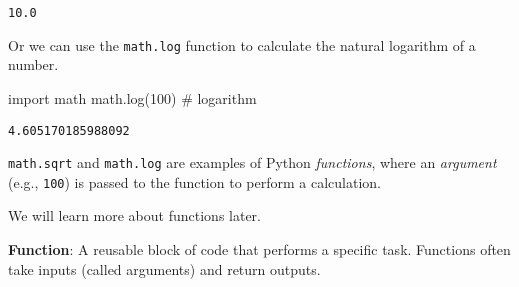 \documentclass[
  letterpaper,
  DIV=11,
  numbers=noendperiod]{scrreprt}
\newenvironment{Shaded}{\begin{snugshade}}{\end{snugshade}}
\newcommand{\CommentTok}[1]{\textcolor[rgb]{0.37,0.37,0.37}{#1}}
\newcommand{\DecValTok}[1]{\textcolor[rgb]{0.68,0.00,0.00}{#1}}
\newcommand{\ImportTok}[1]{\textcolor[rgb]{0.00,0.46,0.62}{#1}}
\newcommand{\NormalTok}[1]{\textcolor[rgb]{0.00,0.23,0.31}{#1}}
\begin{document}
\begin{verbatim}
10.0
\end{verbatim}

Or we can use the \texttt{math.log} function to calculate the natural
logarithm of a number.

\begin{Shaded}
\begin{Highlighting}[]
\ImportTok{import}\NormalTok{ math}
\NormalTok{math.log(}\DecValTok{100}\NormalTok{)  }\CommentTok{\# logarithm}
\end{Highlighting}
\end{Shaded}

\begin{verbatim}
4.605170185988092
\end{verbatim}

\texttt{math.sqrt} and \texttt{math.log} are examples of Python
\emph{functions}, where an \emph{argument} (e.g., \texttt{100}) is
passed to the function to perform a calculation.

We will learn more about functions later.

\begin{tcolorbox}[enhanced jigsaw, colframe=quarto-callout-note-color-frame, opacityback=0, titlerule=0mm, bottomrule=.15mm, breakable, leftrule=.75mm, colbacktitle=quarto-callout-note-color!10!white, title=\textcolor{quarto-callout-note-color}{\faInfo}\hspace{0.5em}{Vocab}, rightrule=.15mm, coltitle=black, opacitybacktitle=0.6, colback=white, left=2mm, arc=.35mm, toptitle=1mm, bottomtitle=1mm, toprule=.15mm]

\textbf{Function}: A reusable block of code that performs a specific
task. Functions often take inputs (called arguments) and return outputs.

\end{tcolorbox}
\end{document}
